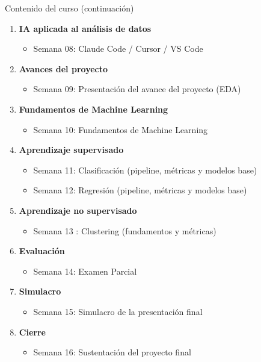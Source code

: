 \documentclass[10pt, xcolor=dvipsnames]{beamer}
\begin{document}
\begin{frame}{Contenido del curso (continuación)}
\small
\begin{enumerate}
  \item \textbf{IA aplicada al análisis de datos}
  \begin{itemize}
    \item Semana 08: Claude Code / Cursor / VS Code
  \end{itemize}

  \item \textbf{Avances del proyecto}
  \begin{itemize}
    \item Semana 09: Presentación del avance del proyecto (EDA)
  \end{itemize}

  \item \textbf{Fundamentos de Machine Learning}
  \begin{itemize}
    \item Semana 10: Fundamentos de Machine Learning
  \end{itemize}  

  \item \textbf{Aprendizaje supervisado}
  \begin{itemize}
        \item Semana 11: Clasificación (pipeline, métricas y modelos base)
        \item Semana 12: Regresión (pipeline, métricas y modelos base)
  \end{itemize}  

  \item \textbf{Aprendizaje no supervisado}
  \begin{itemize}
    \item Semana 13
    : Clustering (fundamentos y métricas)
  \end{itemize}  

  \item \textbf{Evaluación}
  \begin{itemize}
        \item Semana 14: Examen Parcial
  \end{itemize}  

  \item \textbf{Simulacro}
  \begin{itemize}
        \item Semana 15: Simulacro de la presentación final
  \end{itemize}  
  
  \item \textbf{Cierre}
  \begin{itemize}
  \item Semana 16: Sustentación del proyecto final
  \end{itemize}
\end{enumerate}
\end{frame}
\end{document}

